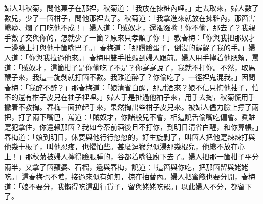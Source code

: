 婦人叫秋菊，問他菓子在那裡，秋菊道：「我放在揀粧內哩。」走去取來，婦人數了數兒，少了一箇柑子，{}問他那裡去了。秋菊道：「我拿進來就放在揀粧內，那箇害饞癆、爛了口吃他不成！」婦人道：「賊奴才，還漲漒嘴！你不偷，那去了？我親手數了交與你的，怎就少了一箇？原來只孝順了你！」教春梅：「你與我把那奴才一邊臉上打與他十箇嘴巴子。」春梅道：「那臢臉蛋子，倒沒的齷齪了我的手。」婦人道：「你與我拉過他來。」春梅用雙手推顙到婦人跟前。婦人用手擰着他腮頰，罵道：「賊奴才，這箇柑子是你偷吃了不是？你寔寔說了，我就不打你。不然，取馬鞭子來，我這一旋剝就打箇不數。我難道醉了？你偷吃了，一徑裡鬼混我。」因問春梅：「我醉不醉？」{}那春梅道：「娘清省白醒，那討酒來？{}娘不信只掏他袖子，怕不的還有柑子皮兒在袖子裡哩。」婦人于是扯過他袖子來，用手去掏，秋菊慌用手撇着不教掏。春梅一面拉起手來，果然掏出些柑子皮兒來。{}被婦人儘力臉上擰了兩把，打了兩下嘴巴，罵道：「賊奴才，你諸般兒不會，相這說舌偷嘴吃偏會。眞賍寔犯拿住，你還賴那箇？我如今茶前酒後且不打你，{}到明日清省白醒，和你算帳。」春梅道：「娘到明日，休要與他行行忽忽的，好生旋剝了，叫箇人把他寔辣辣打與他幾十板子，叫他忍疼，也懼怕些。甚麼逗猴兒似湯那幾棍兒，他纔不放在心上！」那秋菊被婦人擰得臉脹腫的，谷都着嘴往廚下去了。婦人把那一箇柑子平分兩半，又拿了箇蘋婆、石榴，遞與春梅，說道：「這箇與你吃，把那箇留與姥姥吃。」這春梅也不瞧，接過來似有如無，掠在抽替內。婦人把蜜餞也要分開，春梅道：「娘不要分，我懶得吃這甜行貨子，留與姥姥吃罷。」以此婦人不分，都留下了。

